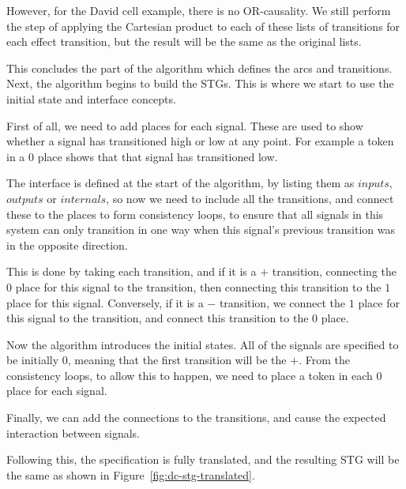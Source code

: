\documentclass[british,conference,compsoc]{IEEEtran}
\begin{document}
However, for the David cell example, there is no OR-causality. We still perform
the step of applying the Cartesian product to each of these lists of transitions
for each effect transition, but the result will be the same as the original lists.

This concludes the part of the algorithm which defines the arcs
and transitions. Next, the algorithm begins to build the STGs. This is where
we start to use the initial state and interface concepts. 

First of all, we need to add places for each signal. These are used to
show whether a signal has transitioned high or low at any point. 
For example a token in a $0$ place shows that that signal has 
transitioned low. 

The interface is defined at the start of the algorithm, by listing them as 
$inputs$, $outputs$ or $internals$, so now we need to include all the 
transitions, and connect these to the places to form consistency loops, to 
ensure that all signals in this system can only transition in one way when this 
signal's previous transition was in the opposite direction. 

This is done by taking each transition, and if it is a $+$ transition, 
connecting the $0$ place for this signal to the transition, then connecting 
this transition to the $1$ place for this signal. Conversely, if it is a $-$ 
transition, we connect the $1$ place for this signal to the transition, and 
connect this transition to the $0$ place.

Now the algorithm introduces the initial states. All of the signals are 
specified to be initially 0, meaning that the first transition will be the $+$.
From the consistency loops, to allow this to happen, we need to place a token 
in each $0$ place for each signal.

Finally, we can add the connections to the transitions, and cause the 
expected interaction between signals. 


Following this, the specification is fully translated, and the resulting STG 
will be the same as shown in Figure~\ref{fig:dc-stg-translated}.
\end{document}
